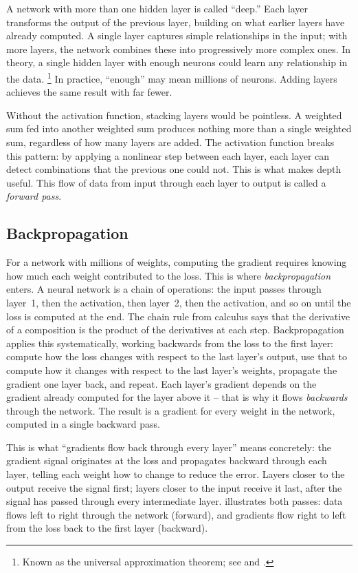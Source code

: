 \smallskip
A network with more than one hidden layer is called ``deep.'' Each layer
transforms the output of the previous layer, building on what earlier
layers have already computed. A single layer captures simple relationships in the input; with more
layers, the network combines these into progressively more complex ones.
In theory, a single hidden layer with enough neurons could learn any
relationship in the data.%
\footnote{Known as the universal approximation theorem; see
\citet{cybenko1989} and \citet{hornik1991}.} In practice, ``enough'' may mean millions of
neurons. Adding layers achieves the same result with far fewer.

\smallskip
Without the activation function, stacking layers would be pointless. A
weighted sum fed into another weighted sum produces nothing more than a
single weighted sum, regardless of how many layers are added. The
activation function breaks this pattern: by applying a nonlinear step
between each layer, each layer can detect combinations that the previous
one could not. This is what makes depth useful.
This flow of data from input through each layer to output is called a
\emph{forward pass}.

\subsection{Backpropagation}
\label{subsec:backpropagation}

For a network with millions of weights, computing the gradient
requires knowing how much each weight contributed to the loss. This
is where \emph{backpropagation} enters. A neural network is a chain
of operations: the input passes through layer~1, then the activation,
then layer~2, then the activation, and so on until the loss is
computed at the end. The chain rule from calculus says that the
derivative of a composition is the product of the derivatives at
each step. Backpropagation applies this systematically, working
backwards from the loss to the first layer: compute how the loss
changes with respect to the last layer's output, use that to
compute how it changes with respect to the last layer's weights,
propagate the gradient one layer back, and repeat. Each layer's
gradient depends on the gradient already computed for the layer
above it -- that is why it flows \emph{backwards} through the
network. The result is a gradient for every weight in the network,
computed in a single backward pass.

\smallskip
This is what ``gradients flow back through every layer'' means
concretely: the gradient signal originates at the loss and
propagates backward through each layer, telling each weight how
to change to reduce the error. Layers closer to the output receive
the signal first; layers closer to the input receive it last, after
the signal has passed through every intermediate layer.
 illustrates both passes: data flows
left to right through the network (forward), and gradients flow
right to left from the loss back to the first layer (backward).

